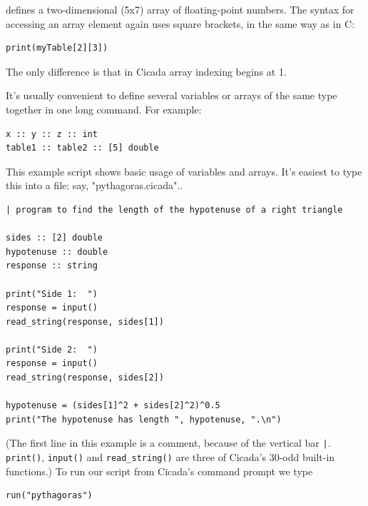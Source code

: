 \documentclass{article}
\newenvironment{code}{
       \begin{list}{}{
               \setlength{\leftmargin}{.4in}
               \setlength{\rightmargin}{0in}
               \setlength{\topsep}{.2in}
       }
       \small
       \item[] }
       { \end{list}   }
\begin{document}
\noindent defines a two-dimensional (5x7) array of floating-point numbers.  The syntax for accessing an array element again uses square brackets, in the same way as in C:

\begin{code} \begin{verbatim}
print(myTable[2][3])
\end{verbatim} \end{code}

\noindent The only difference is that in Cicada array indexing begins at 1.

It's usually convenient to define several variables or arrays of the same type together in one long command.  For example:

\begin{code} \begin{verbatim}
x :: y :: z :: int
table1 :: table2 :: [5] double
\end{verbatim} \end{code}

This example script shows basic usage of variables and arrays.  It's easiest to type this into a file: say, "pythagoras.cicada"..

\begin{code} \begin{verbatim}
| program to find the length of the hypotenuse of a right triangle

sides :: [2] double
hypotenuse :: double
response :: string

print("Side 1:  ")
response = input()
read_string(response, sides[1])

print("Side 2:  ")
response = input()
read_string(response, sides[2])

hypotenuse = (sides[1]^2 + sides[2]^2)^0.5
print("The hypotenuse has length ", hypotenuse, ".\n")
\end{verbatim} \end{code}

\noindent (The first line in this example is a comment, because of the vertical bar \verb#|#.  \verb#print()#, \verb#input()# and \verb#read_string()# are three of Cicada's 30-odd built-in functions.)  To run our script from Cicada's command prompt we type

\begin{code} \begin{verbatim}
run("pythagoras")
\end{verbatim} \end{code}
\end{document}

